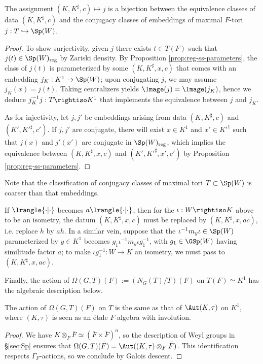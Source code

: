 \documentclass[a4paper,10pt]{article}
\begin{document}
\begin{proposition}\label{prop:parameter-tori}
	The assignment $(K, K^\sharp, c) \mapsto j$ is a bijection between the equivalence classes of data $(K, K^\sharp, c)$ and the conjugacy classes of embeddings of maximal $F$-tori $j: T \hookrightarrow \Sp(W)$.
\end{proposition}
\begin{proof}
	To show surjectivity, given $j$ there exists $t \in T(F)$ such that $j(t) \in \Sp(W)_\text{reg}$ by Zariski density. By Proposition \ref{prop:reg-ss-parameters}, the class of $j(t)$ is parameterized by some $(K, K^\sharp, x, c)$ that comes with an embedding $j_K: K^1 \to \Sp(W)$; upon conjugating $j$, we may assume $j_K(x) = j(t)$. Taking centralizers yields $\Image(j) = \Image(j_K)$, hence we deduce $j_K^{-1} j: T \rightiso K^1$ that implements the equivalence between $j$ and $j_K$.

	As for injectivity, let $j, j'$ be embeddings arising from data $(K, K^\sharp, c)$ and $(K', K'^\sharp, c')$. If $j, j'$ are conjugate, there will exist $x \in K^1$ and $x' \in K'^1$ such that $j(x)$ and $j'(x')$ are conjugate in $\Sp(W)_\text{reg}$, which implies the equivalence between $(K, K^\sharp, x, c)$ and $(K', K'^\sharp, x', c')$ by Proposition \ref{prop:reg-ss-parameters}.
\end{proof}
Note that the classification of conjugacy classes of maximal tori $T \subset \Sp(W)$ is coarser than that embeddings.

\begin{remark}\label{rem:parameter-GSp}
	If $\lrangle{\cdot|\cdot}$ becomes $a\lrangle{\cdot|\cdot}$, then for the $\iota: W \rightiso K$ above to be an isometry, the datum $(K, K^\sharp, x, c)$ must be replaced by $(K, K^\sharp, x, ac)$, i.e. replace $h$ by $ah$. In a similar vein, suppose that the $\iota^{-1} m_y \iota \in \Sp(W)$ parameterized by $y \in K^1$ becomes $g_1 \iota^{-1} m_y \iota g_1^{-1}$, with $g_1 \in \GSp(W)$ having similitude factor $a$; to make $\iota g_1^{-1}: W \to K$ an isometry, we must pass to $(K, K^\sharp, x, ac)$.
\end{remark}

Finally, the action of $\Omega(G,T)(F) := (N_G(T)/T)(F)$ on $T(F) \simeq K^1$ has the algebraic description below.
\begin{proposition}\label{prop:big-Weyl-action}
	The action of $\Omega(G,T)(F)$ on $T$ is the same as that of $\Aut(K, \tau)$ on $K^1$, where $(K, \tau)$ is seen as an étale $F$-algebra with involution.
\end{proposition}
\begin{proof}
	We have $K \otimes_F \bar{F} \simeq (\bar{F} \times \bar{F})^n$, so the description of Weyl groups in \S\ref{sec:Sp} ensures that $\Omega(G,T)(\bar{F}) = \Aut((K, \tau) \otimes_F \bar{F})$. This identification respects $\Gamma_F$-actions, so we conclude by Galois descent.
\end{proof}
\end{document}
